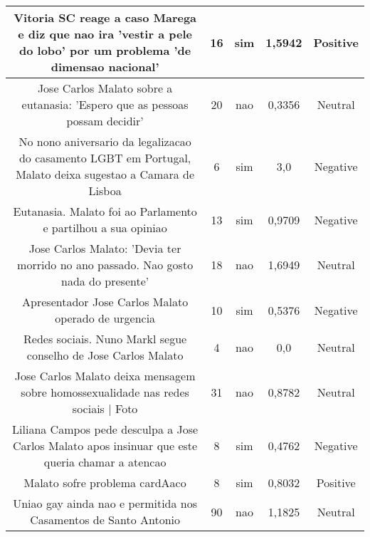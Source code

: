 \documentclass[11pt]{article}
\newlength\mylength
\begin{document}
\begin{center}
\begin{longtable}{||C{.40\mylength}||C{.20\mylength}||C{.20\mylength}||C{.30\mylength}||C{.20\mylength}||}
   Vitoria SC reage a caso Marega e diz que nao ira 'vestir a pele do lobo' por um problema 'de dimensao nacional'  & 16 & sim & 1,5942 & Positive \\  \hline
   Jose Carlos Malato sobre a eutanasia: 'Espero  que as pessoas possam decidir' & 20 & nao & 0,3356 & Neutral \\  \hline
   No nono aniversario da legalizacao do casamento LGBT em Portugal, Malato deixa sugestao a Camara de Lisboa  & 6 & sim & 3,0 & Negative \\  \hline
   Eutanasia. Malato foi ao Parlamento e partilhou a sua opiniao  & 13 & sim & 0,9709 & Negative \\  \hline
   Jose Carlos Malato: 'Devia ter morrido no ano passado. Nao gosto nada do presente'  & 18 & nao & 1,6949 & Neutral \\  \hline
   Apresentador Jose Carlos Malato operado de urgencia  & 10 & sim & 0,5376 & Negative \\  \hline
   Redes sociais. Nuno Markl segue conselho de Jose Carlos Malato  & 4 & nao & 0,0 & Neutral \\  \hline
   Jose Carlos Malato deixa mensagem sobre homossexualidade nas redes sociais | Foto  & 31 & nao & 0,8782 & Neutral \\  \hline
   Liliana Campos pede desculpa a Jose Carlos Malato apos insinuar que este queria chamar a atencao  & 8 & sim & 0,4762 & Negative \\  \hline
   Malato sofre problema cardAaco  & 8 & sim & 0,8032 & Positive \\  \hline
   Uniao gay ainda nao e permitida nos Casamentos de Santo Antonio  & 90 & nao & 1,1825 & Neutral \\  \hline

\end{longtable}
\end{center}
\end{document}
